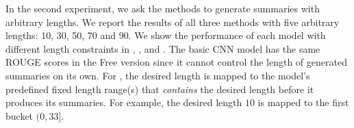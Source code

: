 In the second experiment, we ask the methods to generate
summaries with arbitrary lengths. 
We report the results of all three methods with five arbitrary lengths: 10, 30, 50, 70 and 90.
We show the performance of each model with different
length constraints in , ,  and .
The basic CNN model has the same ROUGE scores in the Free version since it cannot control the length of generated 
summaries on its own.
For \citet{abs-1711-05217}, the desired length is mapped to
the model's predefined fixed length range(s) that {\em contains}
the desired length before it produces its summaries. For example,
the desired length $10$ is mapped to the first bucket $(0, 33]$.

